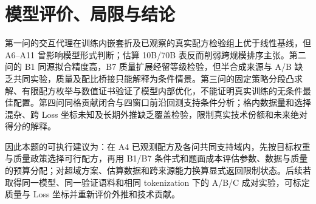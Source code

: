 \section{模型评价、局限与结论}
第一问的交互代理在训练内嵌套折及已观察的真实配方检验组上优于线性基线，但 A6--A11 曾影响模型形式判断；估算 10B/70B 表反而削弱跨规模排序主张。第二问的 B1 同源拟合精度高，B7 质量扩展经留等级检验，但半合成来源与 A/B 缺乏共同实验，质量及配比桥接只能解释为条件情景。第三问的固定策略分段凸求解、有限配方枚举与数值证书验证了模型内部优化，不能证明真实训练的无条件最佳配置。第四问同格贡献闭合与四窗口前沿回测支持条件分析；格内数据量和选择混杂、跨 Loss 坐标未知及长期外推缺乏覆盖检验，限制真实技术份额和未来绝对得分的解释。

因此本题的可执行建议为：在 A4 已观测配方及各问共同支持域内，先按目标权重与质量政策选择可行配方，再用 B1/B7 条件式和题面成本评估参数、数据与质量的预算分配；对超域方案、估算数据和跨来源能力换算显式返回限制状态。后续若取得同一模型、同一验证语料和相同 tokenization 下的 A/B/C 成对实验，可标定质量与 Loss 坐标并重新评价外推和技术贡献。
